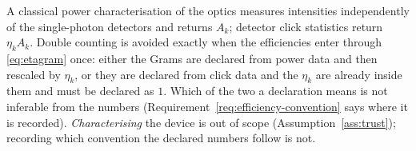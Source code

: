 
\begin{remark}
\label{rem:powervsclick}
A classical power characterisation of the optics measures intensities
independently of the single-photon detectors and returns $A_k$; detector click
statistics return $\eta_kA_k$. Double counting is avoided exactly when the
efficiencies enter through \eqref{eq:etagram} once: either the Grams are
declared from power data and then rescaled by $\eta_k$, or they are declared
from click data and the $\eta_k$ are already inside them and must be declared as
$1$. Which of the two a declaration means is not inferable from the numbers
(Requirement~\ref{req:efficiency-convention} says where it is recorded).
\emph{Characterising} the device is out of scope
(Assumption~\ref{ass:trust}); recording which convention the declared numbers
follow is not.
\end{remark}
